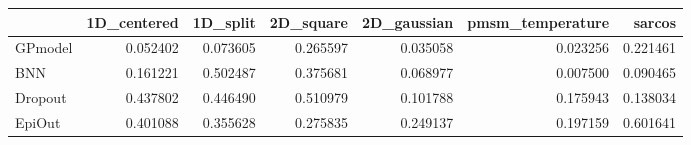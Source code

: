 \begin{tabular}{lrrrrrr}
\toprule
{} &  1D\_centered &  1D\_split &  2D\_square &  2D\_gaussian &  pmsm\_temperature &    sarcos \\
\midrule
GPmodel &     0.052402 &  0.073605 &   0.265597 &     0.035058 &          0.023256 &  0.221461 \\
BNN     &     0.161221 &  0.502487 &   0.375681 &     0.068977 &          0.007500 &  0.090465 \\
Dropout &     0.437802 &  0.446490 &   0.510979 &     0.101788 &          0.175943 &  0.138034 \\
EpiOut  &     0.401088 &  0.355628 &   0.275835 &     0.249137 &          0.197159 &  0.601641 \\
\bottomrule
\end{tabular}
